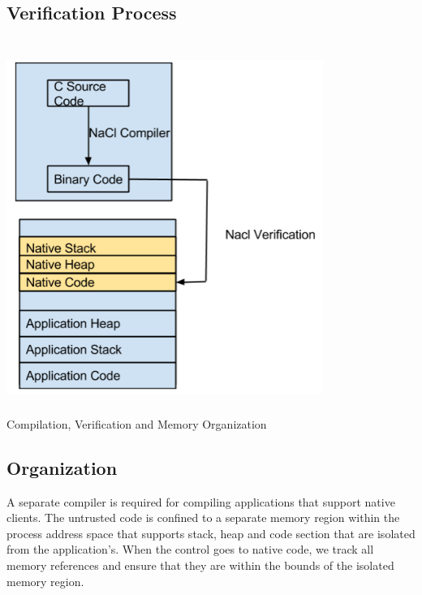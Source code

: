 \documentclass[11pt]{article} %
\begin{document}
\subsection {Verification Process}
\begin {center}
\includegraphics [width=390px,height=460px]{img/f1.png} \\
\caption {Compilation, Verification and Memory Organization}
\end {center}
\pagebreak
\subsection {Organization}
A separate compiler is required for compiling applications that support native
clients. The untrusted code is confined to a separate memory region within the 
process address space that supports stack, heap and code section that are isolated
from the application's. When the control goes to native code, we track all memory
references and ensure that they are within the bounds of the isolated memory region.
\end{document}
